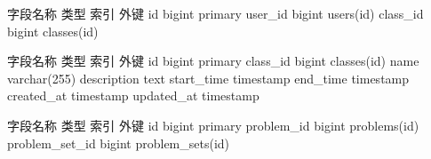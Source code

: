 {}\markdownRendererInterblockSeparator
{}\begin{center}\markdownRendererInterblockSeparator
{}%
{{字段名称}%
{类型}%
{索引}%
{外键}%
}%
{{id}%
{bigint}%
{primary}%
{}%
}%
{{user\_id}%
{bigint}%
{}%
{users(id)}%
}%
{{class\_id}%
{bigint}%
{}%
{classes(id)}%
}%
\markdownRendererInterblockSeparator
{}\end{center}\markdownRendererInterblockSeparator
{}\markdownRendererInterblockSeparator
{}\begin{center}\markdownRendererInterblockSeparator
{}%
{{字段名称}%
{类型}%
{索引}%
{外键}%
}%
{{id}%
{bigint}%
{primary}%
{}%
}%
{{class\_id}%
{bigint}%
{}%
{classes(id)}%
}%
{{name}%
{varchar(255)}%
{}%
{}%
}%
{{description}%
{text}%
{}%
{}%
}%
{{start\_time}%
{timestamp}%
{}%
{}%
}%
{{end\_time}%
{timestamp}%
{}%
{}%
}%
{{created\_at}%
{timestamp}%
{}%
{}%
}%
{{updated\_at}%
{timestamp}%
{}%
{}%
}%
\markdownRendererInterblockSeparator
{}\end{center}\markdownRendererInterblockSeparator
{}\markdownRendererInterblockSeparator
{}\begin{center}\markdownRendererInterblockSeparator
{}%
{{字段名称}%
{类型}%
{索引}%
{外键}%
}%
{{id}%
{bigint}%
{primary}%
{}%
}%
{{problem\_id}%
{bigint}%
{}%
{problems(id)}%
}%
{{problem\_set\_id}%
{bigint}%
{}%
{problem\_sets(id)}%
}%
\markdownRendererInterblockSeparator
{}\end{center}\relax